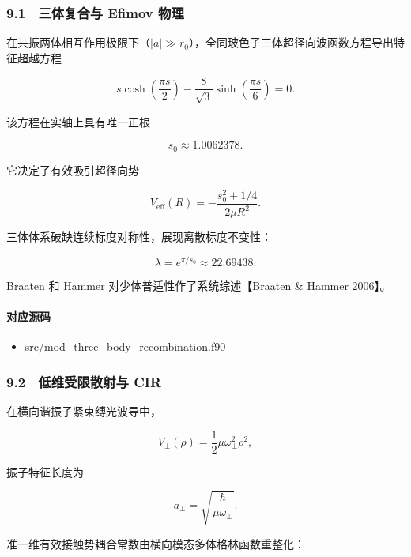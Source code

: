 \documentclass[
]{ctexbook}
\providecommand{\tightlist}{%
  \setlength{\itemsep}{0pt}\setlength{\parskip}{0pt}}
\begin{document}
\hypertarget{ux4e09ux4f53ux590dux5408ux4e0e-efimov-ux7269ux7406}{%
\subsubsection{9.1　三体复合与 Efimov
物理}\label{ux4e09ux4f53ux590dux5408ux4e0e-efimov-ux7269ux7406}}

在共振两体相互作用极限下（\(|a|\gg r_0\)），全同玻色子三体超径向波函数方程导出特征超越方程

\[
s\cosh\left(\frac{\pi s}{2}\right)
-
\frac{8}{\sqrt{3}}\sinh\left(\frac{\pi s}{6}\right)
=
0.
\]

该方程在实轴上具有唯一正根

\[
s_0\approx1.0062378.
\]

它决定了有效吸引超径向势

\[
V_{\mathrm{eff}}(R)
=
-\frac{s_0^2+1/4}{2\mu R^2}.
\]

三体体系破缺连续标度对称性，展现离散标度不变性：

\[
\lambda=e^{\pi/s_0}\approx22.69438.
\]

Braaten 和 Hammer 对少体普适性作了系统综述【Braaten \& Hammer 2006】。

\hypertarget{ux5bf9ux5e94ux6e90ux7801-39}{%
\paragraph{对应源码}\label{ux5bf9ux5e94ux6e90ux7801-39}}

\begin{itemize}
\tightlist
\item
  \href{https://github.com/l1Ha/QuantumGeneralModule/blob/main/src/mod_three_body_recombination.f90}{src/mod\_three\_body\_recombination.f90}
\end{itemize}

\hypertarget{ux4f4eux7ef4ux53d7ux9650ux6563ux5c04ux4e0e-cir}{%
\subsubsection{9.2　低维受限散射与
CIR}\label{ux4f4eux7ef4ux53d7ux9650ux6563ux5c04ux4e0e-cir}}

在横向谐振子紧束缚光波导中，

\[
V_\perp(\rho)=\frac12\mu\omega_\perp^2\rho^2,
\]

振子特征长度为

\[
a_\perp=\sqrt{\frac{\hbar}{\mu\omega_\perp}}.
\]

准一维有效接触势耦合常数由横向模态多体格林函数重整化：
\end{document}
